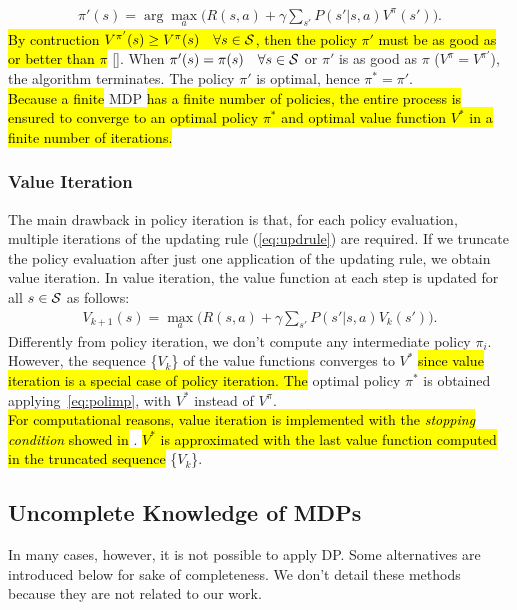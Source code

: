 \begin{align} 
\pi'(s) = \arg \max_{a} \Big( R(s,a) + \gamma \sum_{s'} P(s'|s,a)  V^{\pi}(s') \Big). \label{eq:polimp}
\end{align}
\hl{By contruction $V^{\pi'}(s) \geq V^{\pi}(s) \quad \forall s \in \mathcal{S}$, then the policy $\pi'$ must be as good as or better than $\pi$ }[\cite{sutton2018reinforcement}].
When $\pi'(s) = \pi(s) \quad \forall s \in \mathcal{S}$ or $\pi'$ is as good as $\pi$ (\ie $V^{\pi} = V^{\pi'}$), the algorithm terminates. The policy $\pi'$ is optimal, hence $\pi^{*} = \pi'$.\\
\newline
\hl{Because a finite} \ac{MDP} \hl{has a finite number of policies, the entire process is ensured to converge to an optimal policy $\pi^{*}$ and optimal value function $V^{*}$ in a finite number of iterations.}
\subsubsection{Value Iteration} \label{subsec:vi}
The main drawback in policy iteration is that, for each policy evaluation, multiple iterations of the updating rule (\ref{eq:updrule}) are required. If we truncate the policy evaluation after just one application of the updating rule, we obtain value iteration. In value iteration, the value function at each step is updated for all $s \in \mathcal{S}$ as follows:
\begin{align} V_{k+1}(s) = \max_a \Big( R(s,a) + \gamma \sum_{s'}P(s'|s,a)  V_{k}(s') \Big). \end{align}
Differently from policy iteration, we don't compute any intermediate policy $\pi_i$. However, the sequence \{$V_{k}$\} of the value functions converges to $V^{*}$ \hl{since value iteration is a special case of policy iteration. The} optimal policy $\pi^{*}$ is obtained applying~\eqref{eq:polimp}, with $V^{*}$ instead of $V^{\pi}$.\\
\newline
\hl{For computational reasons, value iteration is implemented with the \emph{stopping condition} showed in} . \hl{$V^{*}$ is approximated with the last value function computed in the truncated sequence} \{$V_{k}$\}.

\subsection{Uncomplete Knowledge of \ac{MDPs}}
In many cases, however, it is not possible to apply \ac{DP}. Some alternatives are introduced below for sake of completeness. We don't detail these methods because they are not related to our work.  

